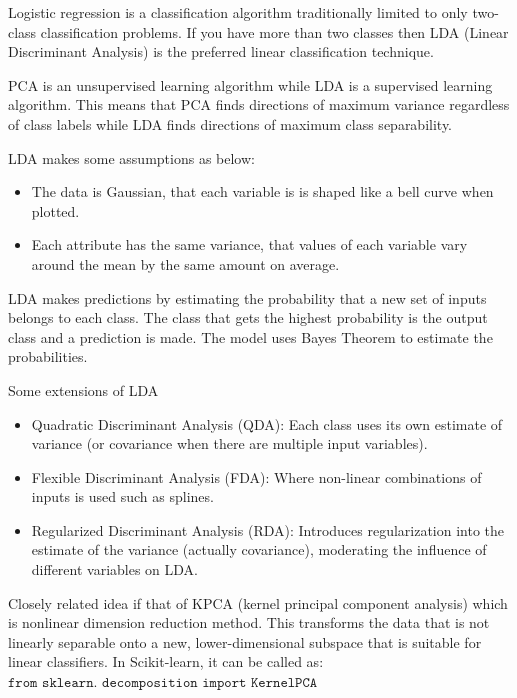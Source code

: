 \documentclass[11pt]{article}
\begin{document}
Logistic regression is a classification algorithm traditionally limited to only two-class classification problems.
If you have more than two classes then LDA (Linear Discriminant Analysis) is the preferred linear classification technique.



PCA is an unsupervised learning algorithm while LDA is a supervised learning algorithm. 
This means that PCA finds directions of maximum variance regardless of class labels while LDA finds directions of maximum class separability.


LDA makes some assumptions as below: 
\begin{itemize} 
\item The data is Gaussian, that each variable is is shaped like a bell curve when plotted.
\item Each attribute has the same variance, that values of each variable vary around the mean by the same amount on average.
\end{itemize} 
LDA makes predictions by estimating the probability that a new set of inputs belongs to each class. The class that gets the highest probability is the output class and a prediction is made.
The model uses Bayes Theorem to estimate the probabilities.

Some extensions of LDA 

\begin{itemize} 
\item Quadratic Discriminant Analysis (QDA): Each class uses its own estimate of variance (or covariance when there are multiple input variables).
\item Flexible Discriminant Analysis (FDA): Where non-linear combinations of inputs is used such as splines.
\item Regularized Discriminant Analysis (RDA): Introduces regularization into the estimate of the variance (actually covariance), moderating the influence of different variables on LDA.
\end{itemize} 

Closely related idea if that of KPCA (kernel principal component analysis) which is nonlinear dimension reduction method. 
This transforms the data that is not linearly separable onto a new, lower-dimensional subspace that is suitable for linear classifiers. 
In Scikit-learn, it can be called as: $\texttt{from sklearn. decomposition import KernelPCA}$
\end{document}
